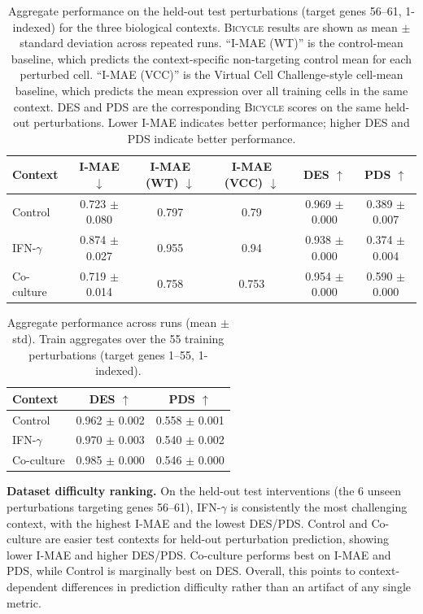 \documentclass[12pt]{article}
\begin{document}
\begin{table}[H]
\centering
\caption{Aggregate performance on the held-out test perturbations (target genes 56--61, 1-indexed) for the three biological contexts. \textsc{Bicycle} results are shown as mean $\pm$ standard deviation across repeated runs. ``I-MAE (WT)'' is the control-mean baseline, which predicts the context-specific non-targeting control mean for each perturbed cell. ``I-MAE (VCC)'' is the Virtual Cell Challenge-style cell-mean baseline, which predicts the mean expression over all training cells in the same context. DES and PDS are the corresponding \textsc{Bicycle} scores on the same held-out perturbations. Lower I-MAE indicates better performance; higher DES and PDS indicate better performance.}
\label{tab:main-metrics-1}
\begin{tabular}{lccccc}
\toprule
Context
& I-MAE \(\downarrow\)
& I-MAE (WT) \(\downarrow\)
& I-MAE (VCC) \(\downarrow\)
& DES \(\uparrow\)
& PDS \(\uparrow\)\\
\midrule
Control
& 0.723 $\pm$ 0.080
& 0.797
& 0.79
& 0.969 $\pm$ 0.000
& 0.389 $\pm$ 0.007\\
IFN-$\gamma$
& 0.874 $\pm$ 0.027
& 0.955
& 0.94
& 0.938 $\pm$ 0.000
& 0.374 $\pm$ 0.004\\
Co-culture
& 0.719 $\pm$ 0.014
& 0.758
& 0.753
& 0.954 $\pm$ 0.000
& 0.590 $\pm$ 0.000\\
\bottomrule
\end{tabular}
\end{table}

\begin{table}[H]
\centering
\caption{Aggregate performance across runs (mean $\pm$ std). Train aggregates over the 55 training perturbations
(target genes 1--55, 1-indexed).}
\label{tab:main-metrics-2}
\begin{tabular}{lcc}
\toprule
Context & DES \(\uparrow\) & PDS \(\uparrow\)\\
\midrule
Control      & 0.962 $\pm$ 0.002 & 0.558 $\pm$ 0.001\\
IFN-$\gamma$ & 0.970 $\pm$ 0.003 & 0.540 $\pm$ 0.002\\
Co-culture   & 0.985 $\pm$ 0.000 & 0.546 $\pm$ 0.000\\
\bottomrule
\end{tabular}
\end{table}

\textbf{Dataset difficulty ranking.} On the held-out test interventions (the 6 unseen perturbations targeting genes 56--61), IFN-$\gamma$ is consistently the most challenging context, with the highest I-MAE and the lowest DES/PDS. Control and Co-culture are easier test contexts for held-out perturbation prediction, showing lower I-MAE and higher DES/PDS. Co-culture performs best on I-MAE and PDS, while Control is marginally best on DES. Overall, this points to context-dependent differences in prediction difficulty rather than an artifact of any single metric.
\end{document}
